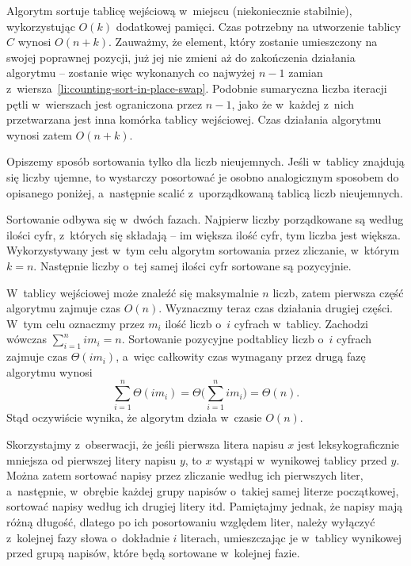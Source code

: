 Algorytm sortuje tablicę wejściową w~miejscu (niekoniecznie stabilnie), wykorzystując $O(k)$ dodatkowej pamięci. Czas potrzebny na utworzenie tablicy $C$ wynosi $O(n+k)$. Zauważmy, że element, który zostanie umieszczony na swojej poprawnej pozycji, już jej nie zmieni aż do zakończenia działania algorytmu -- zostanie więc wykonanych co najwyżej $n-1$ zamian z~wiersza~\ref{li:counting-sort-in-place-swap}. Podobnie sumaryczna liczba iteracji pętli  w~wierszach \doubledash{\ref{li:counting-sort-in-place-while1-begin}}{\ref{li:counting-sort-in-place-while1-end}} jest ograniczona przez $n-1$, jako że w~każdej z~nich przetwarzana jest inna komórka tablicy wejściowej. Czas działania algorytmu wynosi zatem $O(n+k)$.


\subproblem %
Opiszemy sposób sortowania tylko dla liczb nieujemnych. Jeśli w~tablicy znajdują się liczby ujemne, to wystarczy posortować je osobno analogicznym sposobem do opisanego poniżej, a~następnie scalić z~uporządkowaną tablicą liczb nieujemnych.

Sortowanie odbywa się w~dwóch fazach. Najpierw liczby porządkowane są według ilości cyfr, z~których się składają -- im większa ilość cyfr, tym liczba jest większa. Wykorzystywany jest w~tym celu algorytm sortowania przez zliczanie, w~którym $k=n$. Następnie liczby o~tej samej ilości cyfr sortowane są pozycyjnie.

W~tablicy wejściowej może znaleźć się maksymalnie $n$ liczb, zatem pierwsza część algorytmu zajmuje czas $O(n)$. Wyznaczmy teraz czas działania drugiej części. W~tym celu oznaczmy przez $m_i$ ilość liczb o~$i$ cyfrach w~tablicy. Zachodzi wówczas $\sum_{i=1}^nim_i=n$. Sortowanie pozycyjne podtablicy liczb o~$i$ cyfrach zajmuje czas $\Theta(im_i)$, a~więc całkowity czas wymagany przez drugą fazę algorytmu wynosi
\[
    \sum_{i=1}^n\Theta(im_i) = \Theta\biggl(\sum_{i=1}^nim_i\biggr) = \Theta(n).
\]
Stąd oczywiście wynika, że algorytm działa w~czasie $O(n)$.

\subproblem %
Skorzystajmy z~obserwacji, że jeśli pierwsza litera napisu $x$ jest leksykograficznie mniejsza od pierwszej litery napisu $y$, to $x$ wystąpi w~wynikowej tablicy przed $y$. Można zatem sortować napisy przez zliczanie według ich pierwszych liter, a~następnie, w~obrębie każdej grupy napisów o~takiej samej literze początkowej, sortować napisy według ich drugiej litery itd. Pamiętajmy jednak, że napisy mają różną długość, dlatego po ich posortowaniu względem  liter, należy wyłączyć z~kolejnej fazy słowa o~dokładnie $i$ literach, umieszczając je w~tablicy wynikowej przed grupą napisów, które będą sortowane w~kolejnej fazie.

